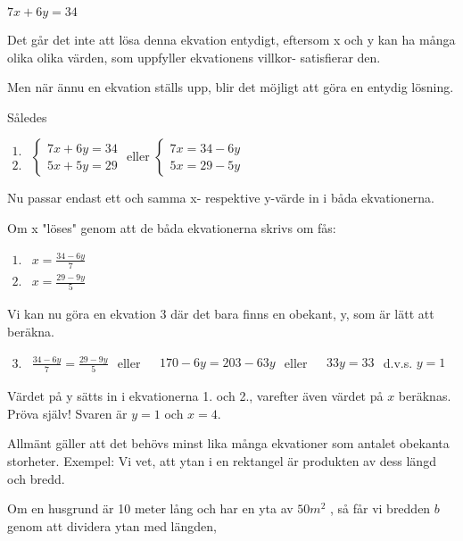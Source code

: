 \(7x+6y=34\)

Det går det inte att lösa denna ekvation entydigt, eftersom x och y kan ha många
olika olika värden, som uppfyller ekvationens villkor- satisfierar den.

Men när ännu en ekvation ställs upp, blir det möjligt att göra en entydig
lösning.

Således

\(
\begin{array}{c}
1.\\2.
\end{array}
\) \(
\left\{
\begin{array}{l}
7x + 6y = 34\\
5x + 5y = 29
\end{array}
\right.
\) eller \(
\left\{
\begin{array}{l}
7x = 34 - 6y\\
5x = 29 - 5y 
\end{array}
\right. 
\)

Nu passar endast ett och samma x- respektive y-värde in i båda ekvationerna.

Om x "löses" genom att de båda ekvationerna skrivs om fås:

\(
\begin{array}{ll}
1. & x = \frac{34-6y}{7}\\
2. & x = \frac{29-9y}{5}
\end{array}
\)

Vi kan nu göra en ekvation 3 där det bara finns en obekant, y, som är lätt
att beräkna.

\(
\begin{array}{ll}
3. & \frac{34 - 6y}{7} = \frac{29 - 9y}{5}
\end{array}
\) eller
\(
\begin{array}{ll}
 & 170 - 6y = 203-63y
\end{array}
\) eller
\(
\begin{array}{ll}
 & 33y = 33
\end{array}
\) d.v.s. \(y = 1\)

Värdet på y sätts in i ekvationerna 1. och 2., varefter även värdet på \(x\)
beräknas.
Pröva själv! Svaren är \(y = 1\) och \(x = 4\).

Allmänt gäller att det behövs minst lika många ekvationer som antalet obekanta
storheter.
Exempel:
Vi vet, att ytan i en rektangel är produkten av dess längd och bredd.

Om en husgrund är 10 meter lång och har en yta av \(50 m^2\) , så får vi bredden
\(b\) genom att dividera ytan med längden,

